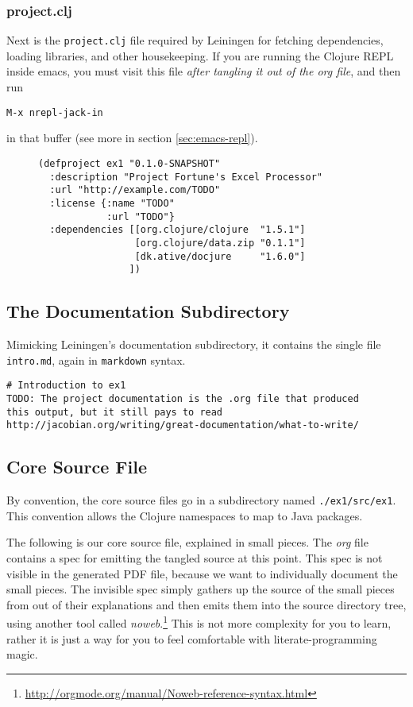 \documentclass[11pt]{article}
\begin{document}
\subsubsection{project.clj}
\label{sec-2-1-3}
Next is the \verb+project.clj+ file required by Leiningen for fetching
dependencies, loading libraries, and other housekeeping. If you are
running the Clojure REPL inside emacs, you must visit this file \emph{after
tangling it out of the org file}, and then run
\begin{verbatim}
M-x nrepl-jack-in
\end{verbatim}
in that buffer (see more in section
\ref{sec:emacs-repl}). 
\begin{figure}[H]
\label{project-file}
\begin{verbatim}
(defproject ex1 "0.1.0-SNAPSHOT"
  :description "Project Fortune's Excel Processor"
  :url "http://example.com/TODO"
  :license {:name "TODO"
            :url "TODO"}
  :dependencies [[org.clojure/clojure  "1.5.1"]
                 [org.clojure/data.zip "0.1.1"]
                 [dk.ative/docjure     "1.6.0"]
                ])
\end{verbatim}
\end{figure}
\subsection{The Documentation Subdirectory}
\label{sec-2-2}
Mimicking Leiningen's documentation subdirectory, it contains the
single file \verb+intro.md+, again in \verb+markdown+ syntax.
\begin{verbatim}
# Introduction to ex1
TODO: The project documentation is the .org file that produced 
this output, but it still pays to read
http://jacobian.org/writing/great-documentation/what-to-write/
\end{verbatim}

\subsection{Core Source File}
\label{sec-2-3}
By convention, the core source files go in a subdirectory named
\verb+./ex1/src/ex1+. This convention allows the Clojure namespaces
to map to Java packages.

The following is our core source file, explained in small pieces.
The \emph{org} file contains a spec for emitting the tangled source at
this point. This spec is not visible in the generated PDF file,
because we want to individually document the small pieces. The
invisible spec simply gathers up the source of the small pieces from
out of their explanations and then emits them into the source
directory tree, using another tool called
\emph{noweb}.\footnote{\url{http://orgmode.org/manual/Noweb-reference-syntax.html}}
This is not more complexity for you to learn, rather it is just a
way for you to feel comfortable with literate-programming magic.
\end{document}
